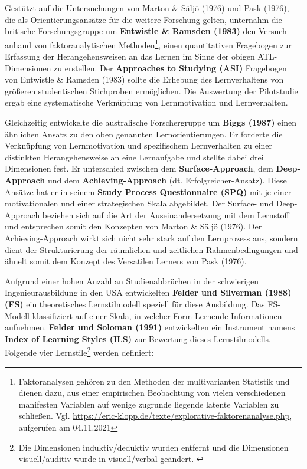         Gestützt auf die Untersuchungen von Marton \& Säljö (1976) und Pask (1976), die als Orientierungsansätze für die weitere Forschung gelten, unternahm die britische Forschungsgruppe um \textbf{Entwistle \& Ramsden (1983)} den Versuch anhand von faktoranalytischen Methoden\footnote{Faktoranalysen gehören zu den Methoden der multivarianten Statistik und dienen dazu, aus einer empirischen Beobachtung von vielen verschiedenen manifesten Variablen auf wenige zugrunde liegende latente Variablen zu schließen. Vgl. \url{https://eric-klopp.de/texte/explorative-faktorenanalyse.php}, aufgerufen am 04.11.2021},
        einen quantitativen Fragebogen zur 
        Erfassung der Herangehensweisen an das Lernen im Sinne der obigen ATL-Dimensionen zu erstellen. Der \textbf{\glqq Approaches to Studying\grqq{}  (ASI)}  Fragebogen von Entwistle \& Ramsden (1983) sollte die Erhebung 
        des Lernverhaltens von größeren studentischen Stichproben ermöglichen. Die Auswertung der Pilotstudie ergab eine systematische Verknüpfung von Lernmotivation und Lernverhalten. \parencite[9]{Martin.2012}\parencite[368 f.]{Cress.2006} 

        Gleichzeitig entwickelte die australische Forschergruppe um \textbf{Biggs (1987)} einen ähnlichen Ansatz zu den oben genannten Lernorientierungen. \nocite{Biggs.1987}
        Er forderte die Verknüpfung von Lernmotivation und spezifischem Lernverhalten zu einer distinkten Herangehensweise an eine Lernaufgabe und stellte dabei drei Dimensionen fest. Er unterschied zwischen 
        dem \textbf{\glqq Surface-Approach\grqq{}}, dem \textbf{\glqq Deep-Approach\grqq{}} und dem \textbf{\glqq Achieving-Approach\grqq{}} (dt. Erfolgreicher-Ansatz).
        Diese Ansätze hat er in seinem  \textbf{\glqq Study Process Questionnaire\grqq{} (SPQ)} mit je einer motivationalen und einer strategischen Skala abgebildet. \parencite[10]{Martin.2012}\parencite[367 ff.]{Cress.2006} 
        Der Surface- und Deep-Approach beziehen sich auf die Art der Auseinandersetzung mit dem Lernstoff und entsprechen somit den Konzepten von Marton \& Säljö (1976). \parencite[383]{Wild.2000}
        Der Achieving-Approach wirkt sich nicht sehr stark auf den Lernprozess aus, sondern dient der Strukturierung der räumlichen und zeitlichen Rahmenbedingungen und ähnelt somit dem Konzept des Versatilen Lerners von Pask (1976). \parencite[15]{Thielke.2003}
        
        Aufgrund einer hohen Anzahl an Studienabbrüchen in der schwierigen Ingenieurausbildung in den USA entwickelten 
        \textbf{Felder und Silverman (1988) (FS)} ein theoretisches Lernstilmodell speziell für diese Ausbildung. Das FS-Modell klassifiziert 
        auf einer Skala, in welcher Form Lernende Informationen aufnehmen. \parencite[21 f.]{Felder.1995} \parencite[674]{Felder.1988}
        \textbf{Felder und Soloman (1991)} entwickelten ein Instrument namens \textbf{\glqq Index of Learning Styles\grqq{} (ILS)} zur Bewertung dieses 
        Lernstilmodells. \parencite[2]{Felder.2002}
        Folgende vier
        Lernstile\footnote{Die Dimensionen induktiv/deduktiv wurden entfernt und die Dimensionen visuell/auditiv wurde in visuell/verbal geändert. \parencite[1 f.]{Felder.2002}} werden definiert: 
        
